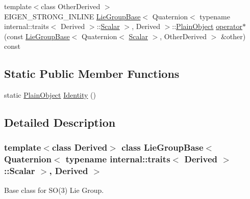\begin{DoxyCompactItemize}
{\footnotesize template$<$class Other\+Derived $>$ }\\E\+I\+G\+E\+N\+\_\+\+S\+T\+R\+O\+N\+G\+\_\+\+I\+N\+L\+I\+NE \hyperlink{class_lie_group_base}{Lie\+Group\+Base}$<$ Quaternion$<$ typename internal\+::traits$<$ Derived $>$\+::\hyperlink{class_lie_group_base_3_01_quaternion_3_01typename_01internal_1_1traits_3_01_derived_01_4_1_1_scalar_01_4_00_01_derived_01_4_afadeceb3b98e52deecc572e71efb82a8}{Scalar} $>$, Derived $>$\+::\hyperlink{class_lie_group_base_3_01_quaternion_3_01typename_01internal_1_1traits_3_01_derived_01_4_1_1_scalar_01_4_00_01_derived_01_4_aadda973938291d3ccd25e606c6333a27}{Plain\+Object} \hyperlink{class_lie_group_base_3_01_quaternion_3_01typename_01internal_1_1traits_3_01_derived_01_4_1_1_scalar_01_4_00_01_derived_01_4_a88a76ea8826bf9cda900a487878d2556}{operator$\ast$} (const \hyperlink{class_lie_group_base}{Lie\+Group\+Base}$<$ Quaternion$<$ \hyperlink{class_lie_group_base_3_01_quaternion_3_01typename_01internal_1_1traits_3_01_derived_01_4_1_1_scalar_01_4_00_01_derived_01_4_afadeceb3b98e52deecc572e71efb82a8}{Scalar} $>$, Other\+Derived $>$ \&other) const
\end{DoxyCompactItemize}
\subsection*{Static Public Member Functions}
\begin{DoxyCompactItemize}
\item 
static \hyperlink{class_lie_group_base_3_01_quaternion_3_01typename_01internal_1_1traits_3_01_derived_01_4_1_1_scalar_01_4_00_01_derived_01_4_aadda973938291d3ccd25e606c6333a27}{Plain\+Object} \hyperlink{class_lie_group_base_3_01_quaternion_3_01typename_01internal_1_1traits_3_01_derived_01_4_1_1_scalar_01_4_00_01_derived_01_4_abb587cf4ebe59eec7a6a7d9534ae3c43}{Identity} ()
\end{DoxyCompactItemize}


\subsection{Detailed Description}
\subsubsection*{template$<$class Derived$>$\newline
class Lie\+Group\+Base$<$ Quaternion$<$ typename internal\+::traits$<$ Derived $>$\+::\+Scalar $>$, Derived $>$}

Base class for S\+O(3) Lie Group. 

